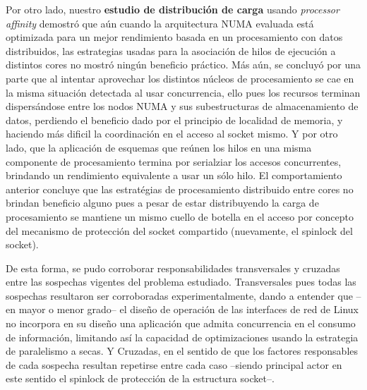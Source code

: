 \begin{conclusion}
 
Por otro lado, nuestro \textbf{estudio de distribución de carga} usando \emph{processor affinity} demostró que aún cuando la arquitectura NUMA evaluada está optimizada para un mejor rendimiento basada en un procesamiento con datos distribuidos, las estrategias usadas para la asociación de hilos de ejecución a distintos cores no mostró ningún beneficio práctico. Más aún, se concluyó por una parte que al intentar aprovechar los distintos núcleos de procesamiento se cae en la misma situación detectada al usar concurrencia, ello pues los recursos terminan dispersándose entre los nodos NUMA y sus subestructuras de almacenamiento de datos, perdiendo el beneficio dado por el principio de localidad de memoria, y haciendo más dificil la coordinación en el acceso al socket mismo. Y por otro lado, que la aplicación de esquemas que reúnen los hilos en una misma componente de procesamiento termina por serialziar los accesos concurrentes, brindando un rendimiento equivalente a usar un sólo hilo. El comportamiento anterior concluye que las estratégias de procesamiento distribuido entre cores no brindan beneficio alguno pues a pesar de estar distribuyendo la carga de procesamiento se mantiene un mismo cuello de botella en el acceso por concepto del mecanismo de protección del socket compartido (nuevamente, el spinlock del socket). 
 
 
De esta forma, se pudo corroborar responsabilidades transversales y cruzadas entre las sospechas vigentes del problema estudiado. Transversales pues todas las sospechas resultaron ser corroboradas experimentalmente, dando a entender que --en mayor o menor grado-- el diseño de operación de las interfaces de red de Linux no incorpora en su diseño una aplicación que admita concurrencia en el consumo de información, limitando así la capacidad de optimizaciones usando la estrategia de paralelismo a secas. Y Cruzadas, en el sentido de que los factores responsables de cada sospecha resultan repetirse entre cada caso --siendo principal actor en este sentido el spinlock de protección de la estructura socket--. 
 

\end{conclusion}
